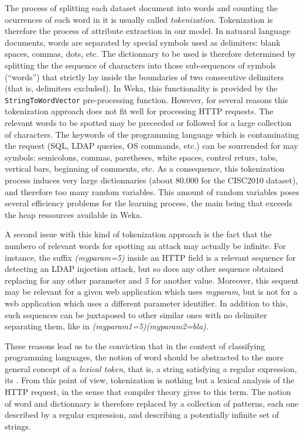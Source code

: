 \documentclass[runningheads,a4paper]{llncs}
\newcommand{\commentatside}[1]{\pdfcomment[color={0.045 0.278 0.643},icon=Note]{#1}}
\newcommand{\todo}[1]{\commentatside{#1}}
\begin{document}
The process of splitting each dataset document into words and counting the ocurrences of each word in it is usually called \textit{tokenization}. Tokenization is therefore the process of attribute extraction in our model. In natuaral language documents, words are separated by special symbols used as delimiters: blank spaces, commas, dots, etc. The dictionnary to be used is therefore determined by splitting the the sequence of characters into those sub-sequences of symbols (``words'') that strictly lay inside the boundaries of two consecutive delimiters (that is, delimiters excluded). In Weka, this functionality is provided by the \texttt{StringToWordVector} pre-processing function. However, for several reasons this tokenization approach does not fit well for processing HTTP requests. The relevant words to be spotted may be preceeded or followed for a large collection of characters. The keywords of the programming language which is contaminating the request (SQL, LDAP queries, OS commands, etc.) can be sourrended for may symbols: semicolons, commas, paretheses, white spaces, control returs, tabs, vertical bars, beginning of comments, etc. As a consequence, this tokenization process induces very large dictionnaries (about 80.000 for the CISC2010 dataset), and therefore too many random variables. This amount of random variables poses several efficiency problems for the learning process, the main being that exceeds the heap ressources available in Weka.

A second issue with this kind of tokenization approach is the fact that the numbero of relevant words for spotting an attack may actually be infinite. For instance, the suffix \textit{(myparam=5)} inside an HTTP field is a relevant sequence for detecting an LDAP injection attack, but so does any other sequence obtained replacing  for any other parameter and \textit{5} for another value. Moreover, this sequent may be relevant for a given web application which uses \textit{myparam}, but is not for a web application which uses a different parameter identifier. In addition to this, such sequences can be juxtaposed to other similar ones with no delimiter separating them, like in \textit{(myparam1=5)(myparam2=bla)}. 

\todo{poner ejemplo real, con passwords, etc sacado de literatura}

These reasons lead us to the conviction that in the context of classifying programming languages, the notion of word should be abstracted to the more general concept of a \textit{lexical token}, that is, a string satisfying a regular expression, its . From this point of view, tokenization is nothing but a lexical analysis of the HTTP request, in the sense that compiler theory gives to this term. The notion of word and dictionnary is therefore replaced by a collection of patterns, each one described by a regular expression, and describing a potentially infinite set of strings. 
\end{document}
